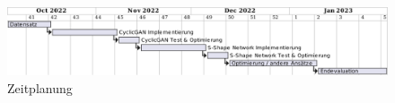 \documentclass[runningheads]{llncs}
\begin{document}
\begin{figure}
    \centering
    \includegraphics[width=\textwidth]{planung.png}
    \caption{
        Zeitplanung
    }
    \label{fig:planung}
\end{figure}

\printbibliography
\end{document}
